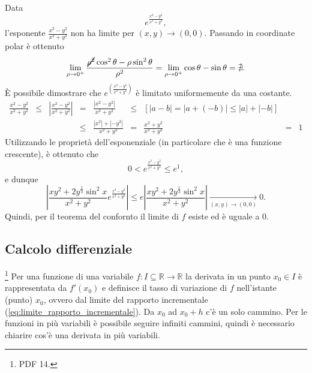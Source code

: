 \begin{example}
	\noindent Data
	\begin{equation*}
		e^{\frac{x^2-y^2}{x^2+y^2}},
	\end{equation*}
	l'esponente $\frac{x^2-y^2}{x^2+y^2}$ non ha limite per $(x,y)\rightarrow(0,0)$. Passando in coordinate polar è ottenuto
	\begin{equation*}
		\lim_{\rho\rightarrow 0^+} \frac{\cancel{\rho^2} \cos^2\theta - \rho\sin^2\theta}{\rho^2} = \lim_{\rho \rightarrow 0^+}\cos\theta-\sin\theta =\nexists.
	\end{equation*}
	È possibile dimostrare che $e^{\left(\frac{x^2-y^2}{x^2+y^2}\right)}$ è limitato uniformemente da una costante.
	\begin{equation*}
		\begin{matrix}
			\frac{x^2-y^2}{x^2+y^2} &\leq& \left|\frac{x^2-y^2}{x^2+y^2}\right| &=&  \frac{|x^2-y^2|}{x^2+y^2} &\leq& [|a-b| = |a+(-b)| \leq |a| + |-b|]\\
			&&&\leq& \frac{|x^2|+|-y^2|}{x^2+y^2} &=& \frac{x^2+y^2}{x^2+y^2} &=& 1
		\end{matrix}
	\end{equation*}
	Utilizzando le proprietà dell'esponenziale (in particolare che è una funzione crescente), è ottenuto che
	\begin{equation*}
		0 < e^{\frac{x^2-y^2}{x^2+y^2}} \leq e^1,
	\end{equation*}
	e dunque
	\begin{equation*}
		\left|\frac{xy^2+2y^{\frac{1}{3}}\sin^2x}{x^2+y^2}e^{\frac{x^2-y^2}{x^2+y^2}}\right| \leq e \left|\frac{xy^2+2y^{\frac{1}{3}}\sin^2x}{x^2+y^2}\right|\underset{(x,y)\rightarrow (0,0)}{\longrightarrow} 0.
	\end{equation*}
	Quindi, per il teorema del confornto il limite di $f$ esiste ed è uguale a 0.
\end{example}

\subsection{Calcolo differenziale}\footnote{PDF 14.}
Per una funzione di una variabile $f:I\subseteq\mathbb R\rightarrow\mathbb R$ la derivata in un punto $x_0\in I$ è rappresentata da $f'(x_0)$ e definisce il tasso di variazione di $f$ nell'istante (punto) $x_0$, ovvero dal limite del rapporto incrementale (\ref{eq:limite_rapporto_incrementale}). Da $x_0$ ad $x_0+h$ c'è un solo cammino. Per le funzioni in più variabili è possibile seguire infiniti cammini, quindi è necessario chiarire cos'è una derivata in più variabili.
